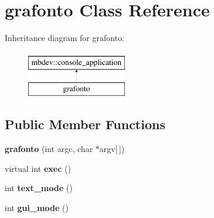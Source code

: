 \hypertarget{classgrafonto}{\section{grafonto \-Class \-Reference}
\label{classgrafonto}
}
\-Inheritance diagram for grafonto\-:\begin{figure}[H]
\begin{center}
\leavevmode
\includegraphics[height=2.000000cm]{classgrafonto}
\end{center}
\end{figure}
\subsection*{\-Public \-Member \-Functions}
\begin{DoxyCompactItemize}
\item 
\hypertarget{classgrafonto_ac24e7e64810ed10cf36656bd7e8e9b12}{{\bfseries grafonto} (int argc, char $\ast$argv\mbox{[}$\,$\mbox{]})}\label{classgrafonto_ac24e7e64810ed10cf36656bd7e8e9b12}

\item 
\hypertarget{classgrafonto_a3f2cce1c012b25e0c66ec2bbdbc3f786}{virtual int {\bfseries exec} ()}\label{classgrafonto_a3f2cce1c012b25e0c66ec2bbdbc3f786}

\item 
\hypertarget{classgrafonto_adfef5ece0152a2c3715eacab7a7673af}{int {\bfseries text\-\_\-mode} ()}\label{classgrafonto_adfef5ece0152a2c3715eacab7a7673af}

\item 
\hypertarget{classgrafonto_ac2ab48fb386a5814d3270e3c70877a16}{int {\bfseries gui\-\_\-mode} ()}\label{classgrafonto_ac2ab48fb386a5814d3270e3c70877a16}

\end{DoxyCompactItemize}
